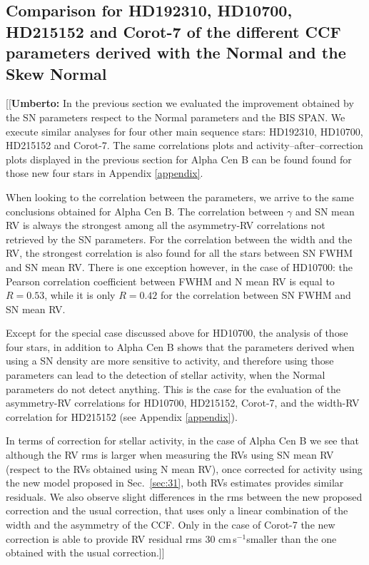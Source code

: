 \documentclass{aa}
\def\cms{\hbox{\,cm\,s$^{-1}$}}       %
\newcommand{\umberto}[1]{{\color{green}[[\textbf{Umberto: }#1]]}}
\begin{document}
\subsection{Comparison for HD192310, HD10700, HD215152 and Corot-7 of the different CCF parameters derived with the Normal and the Skew Normal} \label{sec:real_data_other_stars}

\umberto{In the previous section we evaluated the improvement obtained by the SN parameters respect to the Normal parameters and the BIS SPAN. We execute similar analyses for four other main sequence stars: HD192310, HD10700, HD215152 and Corot-7. The same correlations plots and activity--after--correction plots displayed in the previous section for Alpha Cen B can be found found for those new four stars in Appendix \ref{appendix}.

When looking to the correlation between the parameters, we arrive to the same conclusions obtained for Alpha Cen B. The correlation between $\gamma$ and SN mean RV is always the strongest among all the asymmetry-RV correlations not retrieved by the SN parameters. For the correlation between the width and the RV, the strongest correlation is also found for all the stars between SN FWHM and SN mean RV. There is one exception however, in the case of HD10700: the Pearson correlation coefficient between FWHM and N mean RV is equal to $R=0.53$, while it is only $R=0.42$ for the correlation between SN FWHM and SN mean RV.

Except for the special case discussed above for HD10700, the analysis of those four stars, in addition to Alpha Cen B shows that the parameters derived when using a SN density are more sensitive to activity, and therefore using those parameters can lead to the detection of stellar activity, when the Normal parameters do not detect anything. This is the case for the evaluation of the asymmetry-RV correlations for HD10700, HD215152, Corot-7, and the width-RV correlation for HD215152 (see Appendix \ref{appendix}).

In terms of correction for stellar activity, in the case of Alpha Cen B we see that although the RV rms is larger when measuring the RVs using SN mean RV (respect to the RVs obtained using N mean RV), once corrected for activity using the new model proposed in Sec.~\ref{sec:31}, both RVs estimates provides similar residuals. We also observe slight differences in the rms between the new proposed correction and the usual correction, that uses only a linear combination of the width and the asymmetry of the CCF. Only in the case of Corot-7 the new correction is able to provide RV residual rms 30\,\cms smaller than the one obtained with the usual correction.}
\end{document}
